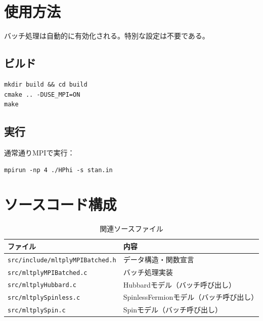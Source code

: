 \documentclass[11pt,a4paper]{article}
\begin{document}
\section{使用方法}

バッチ処理は自動的に有効化される。特別な設定は不要である。

\subsection{ビルド}

\begin{verbatim}
mkdir build && cd build
cmake .. -DUSE_MPI=ON
make
\end{verbatim}

\subsection{実行}

通常通りMPIで実行：
\begin{verbatim}
mpirun -np 4 ./HPhi -s stan.in
\end{verbatim}

\section{ソースコード構成}

\begin{table}[h]
\centering
\begin{tabular}{ll}
\toprule
ファイル & 内容 \\
\midrule
\texttt{src/include/mltplyMPIBatched.h} & データ構造・関数宣言 \\
\texttt{src/mltplyMPIBatched.c} & バッチ処理実装 \\
\texttt{src/mltplyHubbard.c} & Hubbardモデル（バッチ呼び出し） \\
\texttt{src/mltplySpinless.c} & SpinlessFermionモデル（バッチ呼び出し） \\
\texttt{src/mltplySpin.c} & Spinモデル（バッチ呼び出し） \\
\bottomrule
\end{tabular}
\caption{関連ソースファイル}
\end{table}
\end{document}
